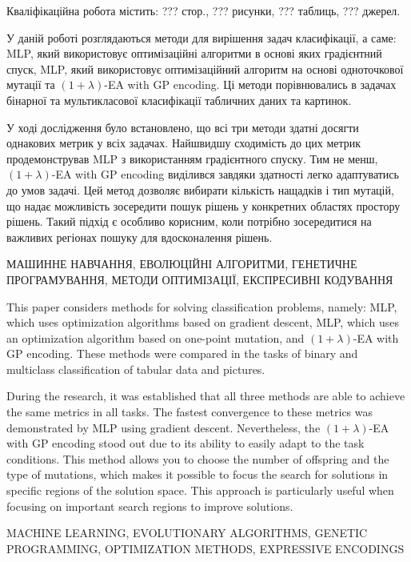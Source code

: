 
\abstractUkr

Кваліфікаційна робота містить: ??? стор., ??? рисунки, ??? таблиць, ??? джерел.

У даній роботі розглядаються методи для вирішення задач класифікації, а саме: MLP, який використовує оптимізаційні алгоритми в основі яких градієнтний спуск, MLP, який використовує оптимізаційний алгоритм на основі одноточкової мутації та $(1+\lambda)$-EA with GP encoding. Ці методи порівнювались в задачах бінарної та мультикласової класифікації табличних даних та картинок.

У ході дослідження було встановлено, що всі три методи здатні досягти однакових метрик у всіх задачах. Найшвидшу сходимість до цих метрик продемонстрував MLP з використанням градієнтного спуску. Тим не менш, $(1+\lambda)$-EA with GP encoding виділився завдяки здатності легко адаптуватись до умов задачі. Цей метод дозволяє вибирати кількість нащадків і тип мутацій, що надає можливість зосередити пошук рішень у конкретних областях простору рішень. Такий підхід є особливо корисним, коли потрібно зосередитися на важливих регіонах пошуку для вдосконалення рішень.


\MakeUppercase{МАШИННЕ НАВЧАННЯ, ЕВОЛЮЦІЙНІ АЛГОРИТМИ, ГЕНЕТИЧНЕ ПРОГРАМУВАННЯ, МЕТОДИ ОПТИМІЗАЦІЇ, ЕКСПРЕСИВНІ КОДУВАННЯ}


%

\abstractEng

This paper considers methods for solving classification problems, namely: MLP, which uses optimization algorithms based on gradient descent, MLP, which uses an optimization algorithm based on one-point mutation, and $(1+\lambda)$-EA with GP encoding. These methods were compared in the tasks of binary and multiclass classification of tabular data and pictures.

During the research, it was established that all three methods are able to achieve the same metrics in all tasks. The fastest convergence to these metrics was demonstrated by MLP using gradient descent. Nevertheless, the $(1+\lambda)$-EA with GP encoding stood out due to its ability to easily adapt to the task conditions. This method allows you to choose the number of offspring and the type of mutations, which makes it possible to focus the search for solutions in specific regions of the solution space. This approach is particularly useful when focusing on important search regions to improve solutions.

\MakeUppercase{MACHINE LEARNING, EVOLUTIONARY ALGORITHMS, GENETIC PROGRAMMING, OPTIMIZATION METHODS, EXPRESSIVE ENCODINGS}

\clearpage